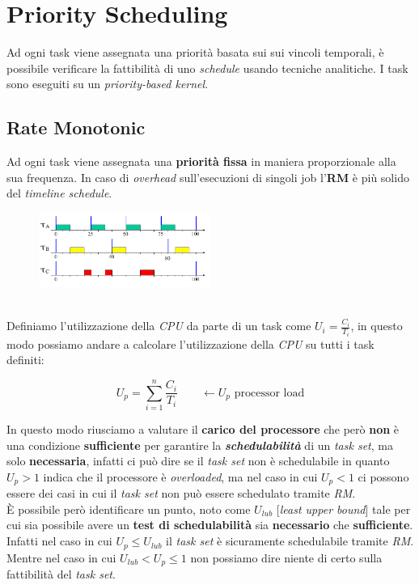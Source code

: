 \section{Priority Scheduling}
Ad ogni task viene assegnata una priorità basata sui sui vincoli temporali, è possibile verificare la fattibilità di uno \textit{schedule} usando tecniche analitiche. I task sono eseguiti su un \textit{priority-based kernel}.

\subsection{Rate Monotonic}
Ad ogni task viene assegnata una \textbf{priorità fissa} in maniera proporzionale alla sua frequenza. In caso di \textit{overhead} sull'esecuzioni di singoli job l'\textbf{RM} è più solido del \textit{timeline schedule}.
\begin{figure}[h]
    \centering
    \includegraphics[width=0.5\textwidth]{img/rm_1}
\end{figure}
\\
Definiamo l'utilizzazione della \textit{CPU} da parte di un task come $U_i = \frac{C_i}{T_i}$, in questo modo possiamo andare a calcolare l'utilizzazione della \textit{CPU} su tutti i task definiti:
\begin{center}
    \[U_p = \sum_{i = 1}^{n} \frac{C_i}{T_i} \qquad \leftarrow U_p \text{ processor load} \]
\end{center}
In questo modo riusciamo a valutare il \textbf{carico del processore} che però \textbf{non} è una condizione \textbf{sufficiente} per garantire la \textbf{\textit{schedulabilità}} di un \textit{task set}, ma solo \textbf{necessaria}, infatti ci può dire se il \textit{task set} non è schedulabile in quanto $U_p > 1$ indica che il processore è \textit{overloaded}, ma nel caso in cui $U_p < 1$ ci possono essere dei casi in cui il \textit{task set} non può essere schedulato tramite \textit{RM}. \\
È possibile però identificare un punto, noto come $U_{lub}$ [\textit{least upper bound}] tale per cui sia possibile avere un \textbf{test di schedulabilità} sia \textbf{necessario} che \textbf{sufficiente}. Infatti nel caso in cui $U_p \leq U_{lub}$ il \textit{task set} è sicuramente schedulabile tramite \textit{RM}. Mentre nel caso in cui $U_{lub} < U_p \leq 1$ non possiamo dire niente di certo sulla fattibilità del \textit{task set}.

